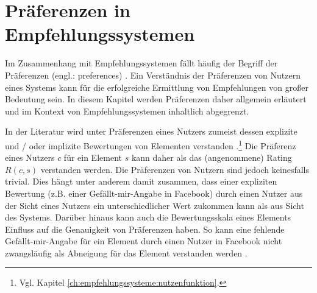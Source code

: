 \section{Präferenzen in Empfehlungssystemen}
\label{ch:empfehlungssysteme:preferences}
Im Zusammenhang mit Empfehlungssystemen fällt häufig der Begriff der Präferenzen (engl.: preferences) \cite[S. 2]{ricci:inbook}\cite[S. 11f.]{recommenderSystems:2016}\cite[S. 87]{ekstrand:article}\cite[S. 2429]{palomares:inproceedings}.
Ein Verständnis der Präferenzen von Nutzern eines Systems kann für die erfolgreiche Ermittlung von Empfehlungen von großer Bedeutung sein. %
In diesem Kapitel werden Präferenzen daher allgemein erläutert und im Kontext von Empfehlungssystemen inhaltlich abgegrenzt.


In der Literatur wird unter Präferenzen eines Nutzers zumeist dessen explizite und / oder implizite Bewertungen von Elementen verstanden \cite[S. 37]{berkovsky:2:article}\cite[S. 743]{adomavicius:inproceedings}\cite[S. 11]{recommenderSystems:2016}\cite[S. 129]{ekstrand:article}\cite[S. 899]{adomavicius:article}.\footnote{Vgl. Kapitel \ref{ch:empfehlungssysteme:nutzenfunktion}.}
Die Präferenz eines Nutzers $c$ für ein Element $s$ kann daher als das (angenommene) Rating $R(c,s)$ verstanden werden.
Die Präferenzen von Nutzern sind jedoch keinesfalls trivial.
Dies hängt unter anderem damit zusammen, dass einer expliziten Bewertung (z.B. einer Gefällt-mir-Angabe in Facebook) durch einen Nutzer aus der Sicht eines Nutzers ein unterschiedlicher Wert zukommen kann als aus Sicht des Systems.
Darüber hinaus kann auch die Bewertungsskala eines Elements Einfluss auf die Genauigkeit von Präferenzen haben.
So kann eine fehlende Gefällt-mir-Angabe für ein Element durch einen Nutzer in Facebook nicht zwangsläufig als Abneigung für das Element verstanden werden \cite[S. 11]{recommenderSystems:2016}.

